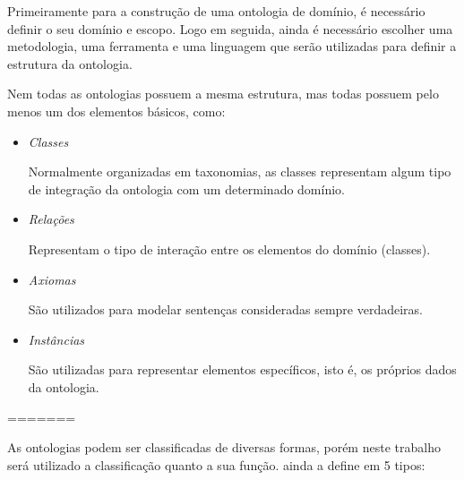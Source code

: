 Primeiramente para a construção de uma ontologia de domínio, é necessário definir
o seu domínio e escopo. Logo em seguida, ainda é necessário escolher uma 
metodologia, uma ferramenta e uma linguagem que serão utilizadas para definir a 
estrutura da ontologia. 

Nem todas as ontologias possuem a mesma estrutura, mas todas possuem pelo menos 
um dos elementos básicos, como:

\begin{itemize}
    \item \textit{Classes}
    
    Normalmente organizadas em taxonomias, as classes representam algum tipo de
    integração da ontologia com um determinado domínio.
    
    \item \textit{Relações}
    
    Representam o tipo de interação entre os elementos do domínio (classes).
    
    \item \textit{Axiomas}
    
    São utilizados para modelar sentenças consideradas sempre verdadeiras.
    
    \item \textit{Instâncias}
    
    São utilizadas para representar elementos específicos, isto é, os próprios 
    dados da ontologia.
\end{itemize}

=======

As ontologias podem ser classificadas de diversas formas, porém neste trabalho
será utilizado a classificação quanto a sua função. \cite{guizzardidesenvolvimento} 
ainda a define em 5 tipos:

